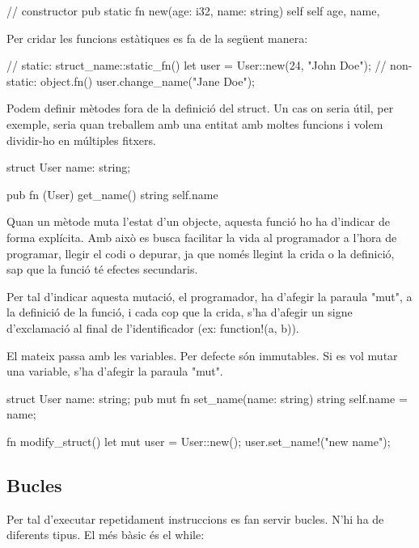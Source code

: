 ﻿\documentclass{article}
\begin{document}
\begin{code}
// constructor
pub static fn new(age: i32, name: string) self {
    self {
        age,
        name,
    }
}
\end{code}

Per cridar les funcions estàtiques es fa de la següent manera:

\begin{code}
// static: struct_name::static_fn()
let user = User::new(24, "John Doe");
// non-static: object.fn()
user.change_name("Jane Doe");
\end{code}

Podem definir mètodes fora de la definició del struct. Un cas on seria útil,
per exemple, seria quan treballem amb una entitat amb moltes funcions i volem
dividir-ho en múltiples fitxers.

\begin{code}
struct User {
    name: string;
}

pub fn (User) get_name() string {
    self.name
}
\end{code}

Quan un mètode muta l'estat d'un objecte, aquesta funció ho ha d'indicar de forma
explícita. Amb això es busca facilitar la vida al programador a l'hora de programar,
llegir el codi o depurar, ja que només llegint la crida o la definició, sap que
la funció té efectes secundaris.

Per tal d'indicar aquesta mutació, el programador, ha d'afegir la paraula "mut",
a la definició de la funció, i cada cop que la crida, s'ha d'afegir un signe
d'exclamació al final de l'identificador (ex: {\ttfamily function!(a, b)}).

El mateix passa amb les variables. Per defecte són immutables. Si es vol mutar
una variable, s'ha d'afegir la paraula "mut".

\begin{code}
struct User {
    name: string;
    pub mut fn set_name(name: string) string {
        self.name = name;
    }
}

fn modify_struct() {
    let mut user = User::new();
    user.set_name!("new name");
}
\end{code}

\subsection{Bucles}

Per tal d'executar repetidament instruccions es fan servir bucles. N'hi ha de
diferents tipus. El més bàsic és el while:
\end{document}
